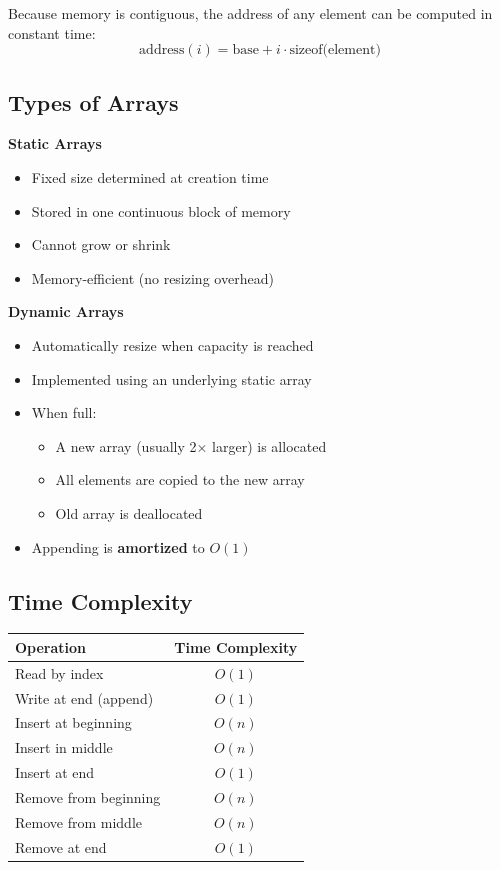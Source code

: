 \documentclass{article}
\begin{document}
Because memory is contiguous, the address of any element can be computed in constant time:
\[
\text{address}(i) = \text{base} + i \cdot \text{sizeof(element)}
\]

\subsection{Types of Arrays}

\textbf{Static Arrays}
\begin{itemize}
  \item Fixed size determined at creation time
  \item Stored in one continuous block of memory
  \item Cannot grow or shrink
  \item Memory-efficient (no resizing overhead)
\end{itemize}
\textbf{Dynamic Arrays}
\begin{itemize}
  \item Automatically resize when capacity is reached
  \item Implemented using an underlying static array
  \item When full:
    \begin{itemize}
      \item A new array (usually 2× larger) is allocated
      \item All elements are copied to the new array
      \item Old array is deallocated
    \end{itemize}
  \item Appending is \textbf{amortized} to $O(1)$
\end{itemize}

\subsection{Time Complexity}

\begin{center}
\begin{tabular}{l c}
\toprule
\textbf{Operation} & \textbf{Time Complexity} \\
\midrule
Read by index & $O(1)$ \\
Write at end (append) & $O(1)$ \\
Insert at beginning & $O(n)$ \\
Insert in middle & $O(n)$ \\
Insert at end & $O(1)$ \\
Remove from beginning & $O(n)$ \\
Remove from middle & $O(n)$ \\
Remove at end & $O(1)$ \\
\bottomrule
\end{tabular}
\end{center}
\end{document}

